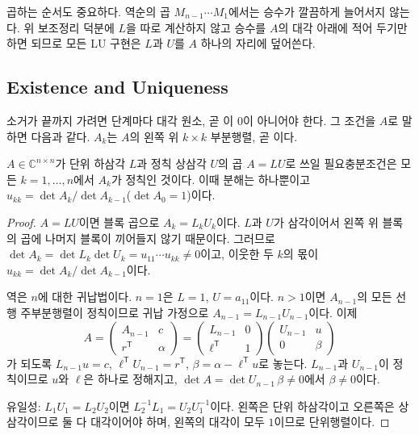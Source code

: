 곱하는 순서도 중요하다. 역순의 곱 $M_{n-1}\cdots M_1$에서는 승수가 깔끔하게 늘어서지 않는다. 위 보조정리 덕분에 $L$을 따로 계산하지 않고 승수를 $A$의 대각 아래에 적어 두기만 하면 되므로 모든 LU 구현은 $L$과 $U$를 $A$ 하나의 자리에 덮어쓴다.

\subsection{Existence and Uniqueness}

소거가 끝까지 가려면 단계마다 대각 원소, 곧 이 $0$이 아니어야 한다. 그 조건을 $A$로 말하면 다음과 같다. $A_k$는 $A$의 왼쪽 위 $k\times k$ 부분행렬, 곧 이다.

\begin{theorem}
\label{thm:lu-existence}
$A\in\mathbb C^{n\times n}$가 단위 하삼각 $L$과 정칙 상삼각 $U$의 곱 $A=LU$로 쓰일 필요충분조건은 모든 $k=1,\dots,n$에서 $A_k$가 정칙인 것이다. 이때 분해는 하나뿐이고 $u_{kk}=\det A_k/\det A_{k-1}$($\det A_0=1$)이다.
\end{theorem}

\begin{proof}
$A=LU$이면 블록 곱으로 $A_k=L_kU_k$이다. $L$과 $U$가 삼각이어서 왼쪽 위 블록의 곱에 나머지 블록이 끼어들지 않기 때문이다. 그러므로 $\det A_k=\det L_k\det U_k=u_{11}\cdots u_{kk}\ne0$이고, 이웃한 두 $k$의 몫이 $u_{kk}=\det A_k/\det A_{k-1}$이다.

역은 $n$에 대한 귀납법이다. $n=1$은 $L=1$, $U=a_{11}$이다. $n>1$이면 $A_{n-1}$의 모든 선행 주부분행렬이 정칙이므로 귀납 가정으로 $A_{n-1}=L_{n-1}U_{n-1}$이다. 이제
\[
A=\begin{pmatrix}A_{n-1}&c\\r^{\mathsf T}&\alpha\end{pmatrix}
=\begin{pmatrix}L_{n-1}&0\\ \ell^{\mathsf T}&1\end{pmatrix}
\begin{pmatrix}U_{n-1}&u\\0&\beta\end{pmatrix}
\]
가 되도록 $L_{n-1}u=c$, $\ell^{\mathsf T}U_{n-1}=r^{\mathsf T}$, $\beta=\alpha-\ell^{\mathsf T}u$로 놓는다. $L_{n-1}$과 $U_{n-1}$이 정칙이므로 $u$와 $\ell$은 하나로 정해지고, $\det A=\det U_{n-1}\,\beta\ne0$에서 $\beta\ne0$이다.

유일성: $L_1U_1=L_2U_2$이면 $L_2^{-1}L_1=U_2U_1^{-1}$이다. 왼쪽은 단위 하삼각이고 오른쪽은 상삼각이므로 둘 다 대각이어야 하며, 왼쪽의 대각이 모두 $1$이므로 단위행렬이다.
\end{proof}

